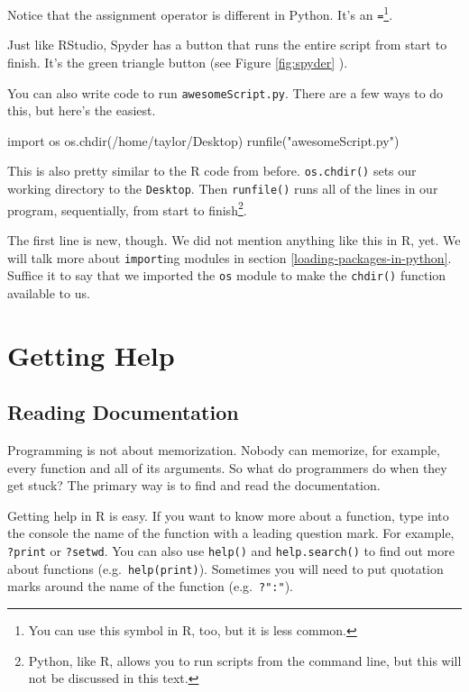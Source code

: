\documentclass[
  12pt,
  krantz2]{krantz}
\makeatletter
\newenvironment{Shaded}{\begin{snugshade}}{\end{snugshade}}
\newcommand{\ImportTok}[1]{#1}
\newcommand{\NormalTok}[1]{#1}
\newcommand{\StringTok}[1]{\textcolor[rgb]{0.5,0.5,0.5}{#1}}
\newenvironment{kframe}{%
\medskip{}
\setlength{\fboxsep}{.8em}
 \def\at@end@of@kframe{}%
 \ifinner\ifhmode%
  \def\at@end@of@kframe{\end{minipage}}%
  \begin{minipage}{\columnwidth}%
 \fi\fi%
 \def\FrameCommand##1{\hskip\@totalleftmargin \hskip-\fboxsep
 \colorbox{shadecolor}{##1}\hskip-\fboxsep
     \hskip-\linewidth \hskip-\@totalleftmargin \hskip\columnwidth}%
 \MakeFramed {\advance\hsize-\width
   \@totalleftmargin\z@ \linewidth\hsize
   \@setminipage}}%
 {\par\unskip\endMakeFramed%
 \at@end@of@kframe}
\renewenvironment{Shaded}{\begin{kframe}}{\end{kframe}}
\makeatother
\begin{document}
Notice that the assignment operator is different in Python. It's an \texttt{=}\footnote{You can use this symbol in R, too, but it is less common.}.

Just like RStudio, Spyder has a button that runs the entire script from start to finish. It's the green triangle button (see Figure \ref{fig:spyder} ).

You can also write code to run \texttt{awesomeScript.py}. There are a few ways to do this, but here's the easiest.

\begin{Shaded}
\begin{Highlighting}[]
\ImportTok{import}\NormalTok{ os}
\NormalTok{os.chdir(}\StringTok{\textquotesingle{}/home/taylor/Desktop\textquotesingle{}}\NormalTok{)}
\NormalTok{runfile(}\StringTok{"awesomeScript.py"}\NormalTok{)}
\end{Highlighting}
\end{Shaded}

This is also pretty similar to the R code from before. \texttt{os.chdir()} sets our working directory to the \texttt{Desktop}. Then \texttt{runfile()} runs all of the lines in our program, sequentially, from start to finish\footnote{Python, like R, allows you to run scripts from the command line, but this will not be discussed in this text.}.

The first line is new, though. We did not mention anything like this in R, yet. We will talk more about \texttt{import}ing modules in section \ref{loading-packages-in-python}. Suffice it to say that we imported the \texttt{os} module to make the \texttt{chdir()} function available to us.

\hypertarget{getting-help}{%
\section{Getting Help}\label{getting-help}}

\hypertarget{reading-documentation}{%
\subsection{Reading Documentation}\label{reading-documentation}}

Programming is not about memorization. Nobody can memorize, for example, every function and all of its arguments. So what do programmers do when they get stuck? The primary way is to find and read the documentation.

Getting help in R is easy. If you want to know more about a function, type into the console the name of the function with a leading question mark. For example, \texttt{?print} or \texttt{?setwd}. You can also use \texttt{help()} and \texttt{help.search()} to find out more about functions (e.g.~\texttt{help(print)}). Sometimes you will need to put quotation marks around the name of the function (e.g.~\texttt{?":"}).
\end{document}
